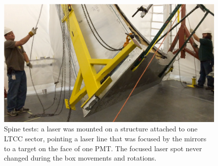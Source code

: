 \begin{figure}
	\centering
	\includegraphics[width=1.0\columnwidth,keepaspectratio]{img/spineTest.png}
	\caption{Spine tests: a laser was mounted on a structure attached to one LTCC sector, pointing a laser line that was focused by the mirrors to a target on the face of one PMT. The focused laser
            spot never changed during the box movements and rotations.}
	\label{fig:spineTest}
\end{figure}





